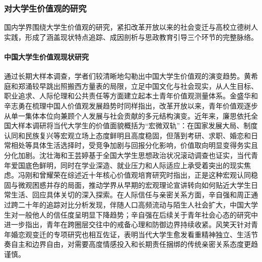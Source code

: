 \subsubsection{对大学生价值观的研究}

国内学界围绕大学生价值观的研究，紧扣改革开放以来的社会变迁与高校立德树人实践，形成了涵盖现状特点追踪、成因剖析与思政教育引导三个环节的完整脉络。

\paragraph{中国大学生价值观现状研究}
通过长期大样本调查，学者们较清晰地勾勒出中国大学生价值观的演变趋势。黄希庭和郑涌较早跳出照搬西方量表的局限，立足中国文化与社会现实，从人生目标、职业追求、人际伦理和公共责任等方面建立起本土青年价值观测量体系\cite{Huang2005}。金盛华和辛志勇在梳理中国人价值观发展趋势时同样指出，改革开放以来，青年价值观逐步从单一集体本位向兼顾个人发展与社会贡献的多元结构演变\cite{BJSF200303008}。近年来，廉思依托全国大样本调研将当代大学生的价值面貌概括为“宏微双轨”：在国家发展大局、制度认同和民族复兴等宏观立场上态度鲜明且高度稳固，但落到考研、求职、婚恋和日常相处等具体生活选择时，受竞争加剧与回报分化影响，价值取向明显变得务实且分化加剧\cite{Lian2024b}。沈壮海和王芸婷基于全国大学生思想政治状况滚动调查也证实，当代青年爱国底色鲜明，同时在学业深造、就业压力和人际适应上承受着突出的现实焦虑\cite{Shen2022}。冯刚和曾耀荣在综述近十年核心价值观培育研究时指出，正是这种宏观认同稳固与微观困惑并存的局面，推动学界从早期的宏观理论宣讲转向如何贴近大学生日常生活、回应具体关切的深入探索\cite{Feng2022}。在人际信任与亲密关系方面，辛自强和周正通过跨二十年的追踪对比分析发现，伴随人口高频流动与陌生人社会扩大，中国大学生对一般他人的信任度呈明显下降趋势\cite{XLXD201203004}；辛自强在后续关于青年社会心态的研究中进一步指出，青年在跨圈层交往中的戒备心理和防御边界持续收紧\cite{Xin2020}。风笑天针对青年婚恋观变迁的专项研究也相互佐证，表明当代大学生愈发看重精神独立、生活节奏自主和边界自由，对需要高度情感投入和长期责任捆绑的传统亲密关系态度更趋谨慎\cite{FengXiaotian2018}。

